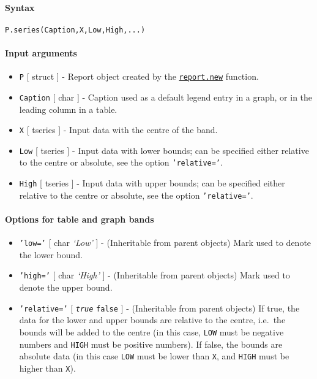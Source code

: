 


	\paragraph{Syntax}

\begin{verbatim}
P.series(Caption,X,Low,High,...)
\end{verbatim}

\paragraph{Input arguments}

\begin{itemize}
\item
  \texttt{P} {[} struct {]} - Report object created by the
  \href{report/new}{\texttt{report.new}} function.
\item
  \texttt{Caption} {[} char {]} - Caption used as a default legend entry
  in a graph, or in the leading column in a table.
\item
  \texttt{X} {[} tseries {]} - Input data with the centre of the band.
\item
  \texttt{Low} {[} tseries {]} - Input data with lower bounds; can be
  specified either relative to the centre or absolute, see the option
  \texttt{'relative='}.
\item
  \texttt{High} {[} tseries {]} - Input data with upper bounds; can be
  specified either relative to the centre or absolute, see the option
  \texttt{'relative='}.
\end{itemize}

\paragraph{Options for table and graph
bands}

\begin{itemize}
\item
  \texttt{'low='} {[} char \textbar{} \emph{`Low'} {]} - (Inheritable
  from parent objects) Mark used to denote the lower bound.
\item
  \texttt{'high='} {[} char \textbar{} \emph{`High'} {]} - (Inheritable
  from parent objects) Mark used to denote the upper bound.
\item
  \texttt{'relative='} {[} \emph{\texttt{true}} \textbar{}
  \texttt{false} {]} - (Inheritable from parent objects) If true, the
  data for the lower and upper bounds are relative to the centre,
  i.e.~the bounds will be added to the centre (in this case,
  \texttt{LOW} must be negative numbers and \texttt{HIGH} must be
  positive numbers). If false, the bounds are absolute data (in this
  case \texttt{LOW} must be lower than \texttt{X}, and \texttt{HIGH}
  must be higher than \texttt{X}).
\end{itemize}

